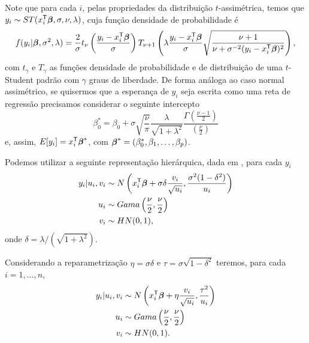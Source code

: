 Note que para cada $i$, pelas propriedades da distribuição $t$-assimétrica, temos que $y_i\sim ST(x_i^{\mathsf{T}}{\boldsymbol{\beta}},\sigma,\nu,\lambda)$, cuja função densidade de probabilidade é
\begin{equation}
f(y_i|{\boldsymbol{\beta}},\sigma^2,\lambda) = \frac{2}{\sigma}t_\nu\left(\frac{y_i-x_i^{\mathsf{T}}{\boldsymbol{\beta}}}{\sigma}\right)T_{\nu+1}\left(\lambda \frac{y_i-x_i^{\mathsf{T}}{\boldsymbol{\beta}}}{\sigma}\sqrt{\frac{\nu+1}{\nu+\sigma^{-2}(y_i-x_i^{\mathsf{T}}{\boldsymbol{\beta}})^2}}\right),
\end{equation}
com $t_\gamma$ e $T_\gamma$ as funções densidade de probabilidade e de distribuição de uma $t$-Student padrão com $\gamma$ graus de liberdade. De forma análoga ao caso normal assimétrico, se quisermos que a esperança de $y_i$ seja escrita como uma reta de regressão precisamos considerar o seguinte intercepto
\begin{equation}
\beta_0^*=\beta_0 + \sigma \sqrt{\frac{\nu}{\pi}} \frac{\lambda}{\sqrt{1+\lambda^2}}\frac{\Gamma\left(\frac{\nu-1}{2}\right)}{\left(\frac{\nu}{2}\right)}
\end{equation}
e, assim, $E[y_i]=x_i^{\mathsf{T}}{\boldsymbol{\beta}}^*$, com ${\boldsymbol{\beta}}^*=(\beta_0^*,\beta_1,\ldots,\beta_p)$.

Podemos utilizar a seguinte representação hierárquica, dada em \citet{Godoi2007:MSc}, para cada $y_i$
\begin{equation} \label{eq:forma_hier}
\begin{split}
y_i|u_i,v_i & \sim  N\left(x_i^{\mathsf{T}}{\boldsymbol{\beta}}+\sigma\delta\frac{v_i}{\sqrt{u_i}},\frac{\sigma^2(1-\delta^2)}{u_i}\right) \\
u_i & \sim  Gama\left(\frac{\nu}{2},\frac{\nu}{2}\right) \\
v_i & \sim  HN(0,1),
\end{split}
\end{equation}
onde $\delta=\lambda/(\sqrt{1+\lambda^2})$.

Considerando a reparametrização $\eta=\sigma\delta$ e $\tau=\sigma\sqrt{1-\delta^2}$ teremos, para cada $i=1,\ldots,n$,
\begin{equation}
\begin{split}
y_i|u_i,v_i & \sim N\left(x_i^{\mathsf{T}}{\boldsymbol{\beta}}+\eta \frac{v_i}{\sqrt{u_i}},\frac{\tau^2}{u_i}\right) \\
u_i & \sim  Gama\left(\frac{\nu}{2},\frac{\nu}{2}\right) \\
v_i & \sim  HN(0,1).
\end{split}
\end{equation}

